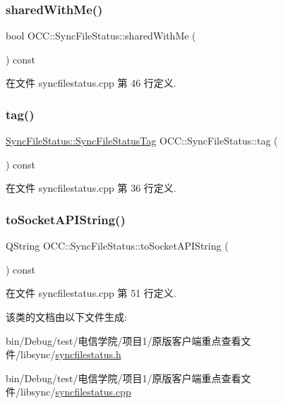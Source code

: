 \subsubsection{\texorpdfstring{shared\+With\+Me()}{sharedWithMe()}}
{\footnotesize\ttfamily bool O\+C\+C\+::\+Sync\+File\+Status\+::shared\+With\+Me (\begin{DoxyParamCaption}{ }\end{DoxyParamCaption}) const}



在文件 syncfilestatus.\+cpp 第 46 行定义.

\mbox{\label{class_o_c_c_1_1_sync_file_status_a10fb70f2ec88fa405b94ded421973f9b}} 
\subsubsection{\texorpdfstring{tag()}{tag()}}
{\footnotesize\ttfamily \hyperlink{class_o_c_c_1_1_sync_file_status_a036555392003d8becbbf4d18d49c358b}{Sync\+File\+Status\+::\+Sync\+File\+Status\+Tag} O\+C\+C\+::\+Sync\+File\+Status\+::tag (\begin{DoxyParamCaption}{ }\end{DoxyParamCaption}) const}



在文件 syncfilestatus.\+cpp 第 36 行定义.

\mbox{\label{class_o_c_c_1_1_sync_file_status_a8baa0900b9b8082f9aedf651bcbff114}} 
\subsubsection{\texorpdfstring{to\+Socket\+A\+P\+I\+String()}{toSocketAPIString()}}
{\footnotesize\ttfamily Q\+String O\+C\+C\+::\+Sync\+File\+Status\+::to\+Socket\+A\+P\+I\+String (\begin{DoxyParamCaption}{ }\end{DoxyParamCaption}) const}



在文件 syncfilestatus.\+cpp 第 51 行定义.



该类的文档由以下文件生成\+:\begin{DoxyCompactItemize}
\item 
bin/\+Debug/test/电信学院/项目1/原版客户端重点查看文件/libsync/\hyperlink{syncfilestatus_8h}{syncfilestatus.\+h}\item 
bin/\+Debug/test/电信学院/项目1/原版客户端重点查看文件/libsync/\hyperlink{syncfilestatus_8cpp}{syncfilestatus.\+cpp}\end{DoxyCompactItemize}
